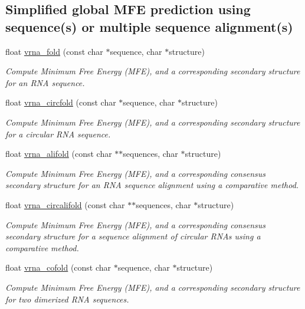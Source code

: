 \subsection*{Simplified global M\+FE prediction using sequence(s) or multiple sequence alignment(s)}
\begin{DoxyCompactItemize}
\item 
float \mbox{\hyperlink{group__mfe__global_ga29a33b2895f4e67b0480271ff289afdc}{vrna\+\_\+fold}} (const char $\ast$sequence, char $\ast$structure)
\begin{DoxyCompactList}\small\item\em Compute Minimum Free Energy (M\+FE), and a corresponding secondary structure for an R\+NA sequence. \end{DoxyCompactList}\item 
float \mbox{\hyperlink{group__mfe__global_gaf973483d8acbc8cc9aacfc8a9b7f0074}{vrna\+\_\+circfold}} (const char $\ast$sequence, char $\ast$structure)
\begin{DoxyCompactList}\small\item\em Compute Minimum Free Energy (M\+FE), and a corresponding secondary structure for a circular R\+NA sequence. \end{DoxyCompactList}\item 
float \mbox{\hyperlink{group__mfe__global_ga6c9d3bef3e92c6d423ffac9f981418c1}{vrna\+\_\+alifold}} (const char $\ast$$\ast$sequences, char $\ast$structure)
\begin{DoxyCompactList}\small\item\em Compute Minimum Free Energy (M\+FE), and a corresponding consensus secondary structure for an R\+NA sequence alignment using a comparative method. \end{DoxyCompactList}\item 
float \mbox{\hyperlink{group__mfe__global_ga17a1be7490468c29c335ba9bffacba53}{vrna\+\_\+circalifold}} (const char $\ast$$\ast$sequences, char $\ast$structure)
\begin{DoxyCompactList}\small\item\em Compute Minimum Free Energy (M\+FE), and a corresponding consensus secondary structure for a sequence alignment of circular R\+N\+As using a comparative method. \end{DoxyCompactList}\item 
float \mbox{\hyperlink{group__mfe__global_ga9ef3a297201dbf838a8daff2b45c0c82}{vrna\+\_\+cofold}} (const char $\ast$sequence, char $\ast$structure)
\begin{DoxyCompactList}\small\item\em Compute Minimum Free Energy (M\+FE), and a corresponding secondary structure for two dimerized R\+NA sequences. \end{DoxyCompactList}\end{DoxyCompactItemize}


